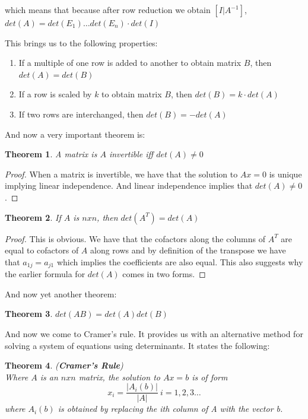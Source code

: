 \documentclass{article}
\newtheorem{thm}{Theorem}[subsection]
\numberwithin{equation}{subsection}
\begin{document}
which means that because after row reduction we obtain $[I | A^{-1}]$, $det(A) = det(E_{1})\ldots det(E_{n}) \cdot det(I)$

This brings us to the following properties:

\begin{enumerate}
    \item If a multiple of one row is added to another to obtain matrix $B$, then $det(A) = det(B)$
    \item If a row is scaled by $k$ to obtain matrix $B$, then $det(B) = k \cdot det(A)$
    \item If two rows are interchanged, then $det(B) = -det(A)$
\end{enumerate}

\clearpage

And now a very important theorem is:

\begin{thm}
A matrix is $A$ invertible iff $det(A) \not = 0$ 
\end{thm}

\begin{proof}
When a matrix is invertible, we have that the solution to $Ax = 0$ is unique implying linear independence. And linear independence implies that $det(A) \not = 0$. 
\end{proof}

\begin{thm}
If $A$ is $nxn$, then $det(A^{T}) = det(A)$
\end{thm}

\begin{proof}
This is obvious. We have that the cofactors along the columns of $A^{T}$ are equal to cofactors of $A$ along rows and by definition of the transpose we have that $a_{1j} = a_{j1}$ which implies the coefficients are also equal. This also suggests why the earlier formula for $det(A)$ comes in two forms. 
\end{proof}

And now yet another theorem:

\begin{thm}
$det(AB) = det(A)det(B)$
\end{thm}


And now we come to Cramer's rule. It provides us with an alternative method for solving a system of equations using determinants. It states the following:

\begin{thm}(\textbf{Cramer's Rule})
\\
Where $A$ is an $n x n$ matrix, the solution to $Ax=b$ is of form 
$$x_{i} = \frac{|A_{i}(b)|}{|A|} \ i=1,2,3\ldots$$ 
where $A_{i}(b)$ is obtained by replacing the ith column of A with the vector b.
\end{thm}
\end{document}
